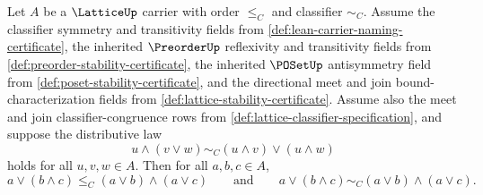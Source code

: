 \begin{theorem}
\label{thm:lattice-meet-distributivity-gives-join-distributivity}
Let $A$ be a $\LatticeUp$ carrier with order $\le_C$ and classifier $\sim_C$. Assume the classifier symmetry and transitivity fields from \autoref{def:lean-carrier-naming-certificate}, the inherited $\PreorderUp$ reflexivity and transitivity fields from \autoref{def:preorder-stability-certificate}, the inherited $\POSetUp$ antisymmetry field from \autoref{def:poset-stability-certificate}, and the directional meet and join bound-characterization fields from \autoref{def:lattice-stability-certificate}. Assume also the meet and join classifier-congruence rows from \autoref{def:lattice-classifier-specification}, and suppose the distributive law
$$
u\wedge(v\vee w)\sim_C (u\wedge v)\vee(u\wedge w)
$$
holds for all $u,v,w\in A$. Then for all $a,b,c\in A$,
$$
a\vee(b\wedge c)\le_C (a\vee b)\wedge(a\vee c)
\qquad\text{and}\qquad
a\vee(b\wedge c)\sim_C (a\vee b)\wedge(a\vee c).
$$
\end{theorem}
